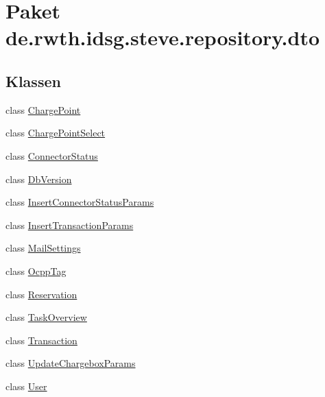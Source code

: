 \hypertarget{namespacede_1_1rwth_1_1idsg_1_1steve_1_1repository_1_1dto}{\section{Paket de.\+rwth.\+idsg.\+steve.\+repository.\+dto}
\label{namespacede_1_1rwth_1_1idsg_1_1steve_1_1repository_1_1dto}
}
\subsection*{Klassen}
\begin{DoxyCompactItemize}
\item 
class \hyperlink{classde_1_1rwth_1_1idsg_1_1steve_1_1repository_1_1dto_1_1_charge_point}{Charge\+Point}
\item 
class \hyperlink{classde_1_1rwth_1_1idsg_1_1steve_1_1repository_1_1dto_1_1_charge_point_select}{Charge\+Point\+Select}
\item 
class \hyperlink{classde_1_1rwth_1_1idsg_1_1steve_1_1repository_1_1dto_1_1_connector_status}{Connector\+Status}
\item 
class \hyperlink{classde_1_1rwth_1_1idsg_1_1steve_1_1repository_1_1dto_1_1_db_version}{Db\+Version}
\item 
class \hyperlink{classde_1_1rwth_1_1idsg_1_1steve_1_1repository_1_1dto_1_1_insert_connector_status_params}{Insert\+Connector\+Status\+Params}
\item 
class \hyperlink{classde_1_1rwth_1_1idsg_1_1steve_1_1repository_1_1dto_1_1_insert_transaction_params}{Insert\+Transaction\+Params}
\item 
class \hyperlink{classde_1_1rwth_1_1idsg_1_1steve_1_1repository_1_1dto_1_1_mail_settings}{Mail\+Settings}
\item 
class \hyperlink{classde_1_1rwth_1_1idsg_1_1steve_1_1repository_1_1dto_1_1_ocpp_tag}{Ocpp\+Tag}
\item 
class \hyperlink{classde_1_1rwth_1_1idsg_1_1steve_1_1repository_1_1dto_1_1_reservation}{Reservation}
\item 
class \hyperlink{classde_1_1rwth_1_1idsg_1_1steve_1_1repository_1_1dto_1_1_task_overview}{Task\+Overview}
\item 
class \hyperlink{classde_1_1rwth_1_1idsg_1_1steve_1_1repository_1_1dto_1_1_transaction}{Transaction}
\item 
class \hyperlink{classde_1_1rwth_1_1idsg_1_1steve_1_1repository_1_1dto_1_1_update_chargebox_params}{Update\+Chargebox\+Params}
\item 
class \hyperlink{classde_1_1rwth_1_1idsg_1_1steve_1_1repository_1_1dto_1_1_user}{User}
\end{DoxyCompactItemize}
